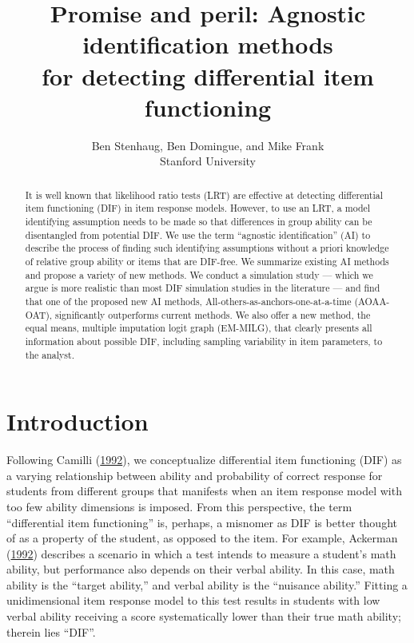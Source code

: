 \documentclass[
  11pt,
]{article}
\title{Promise and peril: Agnostic identification methods\\
for detecting differential item functioning}
\subtitle{Ben Stenhaug, Ben Domingue, and Mike Frank\\
Stanford University}
\author{}
\date{\vspace{-2.5em}}
\begin{document}
\maketitle
\begin{abstract}
It is well known that likelihood ratio tests (LRT) are effective at detecting differential item functioning (DIF) in item response models. However, to use an LRT, a model identifying assumption needs to be made so that differences in group ability can be disentangled from potential DIF. We use the term ``agnostic identification'' (AI) to describe the process of finding such identifying assumptions without a priori knowledge of relative group ability or items that are DIF-free. We summarize existing AI methods and propose a variety of new methods. We conduct a simulation study --- which we argue is more realistic than most DIF simulation studies in the literature --- and find that one of the proposed new AI methods, All-others-as-anchors-one-at-a-time (AOAA-OAT), significantly outperforms current methods. We also offer a new method, the equal means, multiple imputation logit graph (EM-MILG), that clearly presents all information about possible DIF, including sampling variability in item parameters, to the analyst. \clearpage
\end{abstract}

{
\setcounter{tocdepth}{5}
\tableofcontents
}
\clearpage

\hypertarget{intro}{%
\section{Introduction}\label{intro}}

Following Camilli (\protect\hyperlink{ref-camilli1992conceptual}{1992}), we conceptualize differential item functioning (DIF) as a varying relationship between ability and probability of correct response for students from different groups that manifests when an item response model with too few ability dimensions is imposed. From this perspective, the term \enquote{differential item functioning} is, perhaps, a misnomer as DIF is better thought of as a property of the student, as opposed to the item. For example, Ackerman (\protect\hyperlink{ref-ackerman1992didactic}{1992}) describes a scenario in which a test intends to measure a student's math ability, but performance also depends on their verbal ability. In this case, math ability is the \enquote{target ability,} and verbal ability is the \enquote{nuisance ability.} Fitting a unidimensional item response model to this test results in students with low verbal ability receiving a score systematically lower than their true math ability; therein lies \enquote{DIF}.
\end{document}
